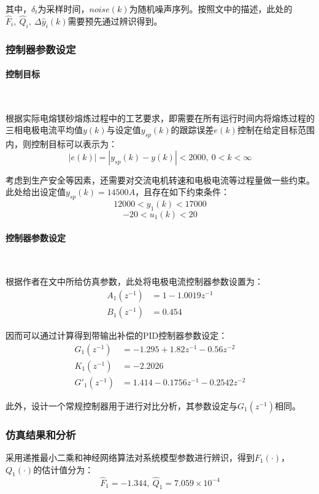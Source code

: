 \documentclass[UTF8, 12pt]{article}
\begin{document}
其中，$\delta_t$为采样时间，$noise(k)$为随机噪声序列。按照文中的描述，此处的$\hat{F}_i,\ \hat{Q}_i,\ \Delta \hat{y}_i(k)$需要预先通过辨识得到。

\subsubsection{控制器参数设定}
\paragraph{控制目标}~{}

根据实际电熔镁砂熔炼过程中的工艺要求，即需要在所有运行时间内将熔炼过程的三相电极电流平均值$y(k)$与设定值$y_{sp}(k)$的跟踪误差$e(k)$控制在给定目标范围内，则控制目标可以表示为：
\begin{equation*}
	|e(k)| = | y_{sp}(k) - y(k) | < 2000,\ 0 < k < \infty
\end{equation*}

考虑到生产安全等因素，还需要对交流电机转速和电极电流等过程量做一些约束。此处给出设定值$y_{sp}(k) = 14500A$，且存在如下约束条件：
\begin{equation*}
	12000 < y_1(k) < 17000
\end{equation*}
\begin{equation*}
	-20 < u_1(k) < 20
\end{equation*}

\paragraph{控制器参数设定}~{}

根据作者在文中所给仿真参数，此处将电极电流控制器参数设置为：
\begin{align*}
	A_1(z^{-1}) &= 1 - 1.0019z^{-1} \\
	B_1(z^{-1}) &= 0.454
\end{align*}

因而可以通过计算得到带输出补偿的PID控制器参数设定：
\begin{align*}
	G_1(z^{-1}) &= -1.295 + 1.82z^{-1} - 0.56z^{-2} \\
	K_1(z^{-1}) &= -2.2026 \\
	G'_1(z^{-1}) &= 1.414 - 0.1756z^{-1} - 0.2542z^{-2}
\end{align*}

此外，设计一个常规控制器用于进行对比分析，其参数设定与$G_1(z^{-1})$相同。

\subsubsection{仿真结果和分析}
采用递推最小二乘和神经网络算法对系统模型参数进行辨识，得到$F_1(\cdot)$，$Q_1(\cdot)$的估计值分为：
\begin{equation*}
	\hat{F}_1 = -1.344 ,\ \hat{Q}_1 = 7.059 \times 10^{-4}
\end{equation*}
\end{document}
